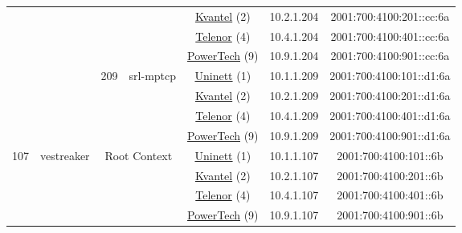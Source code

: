 \begin{small}
\begin{center}
\begin{longtable}{|c|c|c|c|c|c|c|c|}
  &  &  &  & \multicolumn{2}{|c|}{\tiny{\href{http://kvantel.no}{Kvantel} (2)}} & \tiny{10.2.1.204} & \tiny{2001:700:4100:201::cc:6a} \\* \cline{5-5}\cline{6-6}\cline{7-7}\cline{8-8}
  &  &  &  & \multicolumn{2}{|c|}{\tiny{\href{https://www.telenor.no}{Telenor} (4)}} & \tiny{10.4.1.204} & \tiny{2001:700:4100:401::cc:6a} \\* \cline{5-5}\cline{6-6}\cline{7-7}\cline{8-8}
  &  &  &  & \multicolumn{2}{|c|}{\tiny{\href{http://www.powertech.no}{PowerTech} (9)}} & \tiny{10.9.1.204} & \tiny{2001:700:4100:901::cc:6a} \\* \cline{3-3}\cline{4-4}\cline{5-5}\cline{6-6}\cline{7-7}\cline{8-8}
  &  & \multirow{4}{*}{\tiny{209}} & \multicolumn{1}{|l|}{\multirow{4}{*}{\tiny{srl-mptcp}}} & \multicolumn{2}{|c|}{\tiny{\href{https://www.uninett.no}{Uninett} (1)}} & \tiny{10.1.1.209} & \tiny{2001:700:4100:101::d1:6a} \\* \cline{5-5}\cline{6-6}\cline{7-7}\cline{8-8}
  &  &  &  & \multicolumn{2}{|c|}{\tiny{\href{http://kvantel.no}{Kvantel} (2)}} & \tiny{10.2.1.209} & \tiny{2001:700:4100:201::d1:6a} \\* \cline{5-5}\cline{6-6}\cline{7-7}\cline{8-8}
  &  &  &  & \multicolumn{2}{|c|}{\tiny{\href{https://www.telenor.no}{Telenor} (4)}} & \tiny{10.4.1.209} & \tiny{2001:700:4100:401::d1:6a} \\* \cline{5-5}\cline{6-6}\cline{7-7}\cline{8-8}
  &  &  &  & \multicolumn{2}{|c|}{\tiny{\href{http://www.powertech.no}{PowerTech} (9)}} & \tiny{10.9.1.209} & \tiny{2001:700:4100:901::d1:6a} \\ \hline
 \multirow{36}{*}{\tiny{107}} & \multicolumn{1}{|l|}{\multirow{36}{*}{\tiny{vestreaker}}} & \multicolumn{2}{|c|}{\multirow{4}{*}{\tiny{Root Context}}} & \multicolumn{2}{|c|}{\tiny{\href{https://www.uninett.no}{Uninett} (1)}} & \tiny{10.1.1.107} & \tiny{2001:700:4100:101::6b} \\* \cline{5-5}\cline{6-6}\cline{7-7}\cline{8-8}
  &  & \multicolumn{2}{|c|}{} & \multicolumn{2}{|c|}{\tiny{\href{http://kvantel.no}{Kvantel} (2)}} & \tiny{10.2.1.107} & \tiny{2001:700:4100:201::6b} \\* \cline{5-5}\cline{6-6}\cline{7-7}\cline{8-8}
  &  & \multicolumn{2}{|c|}{} & \multicolumn{2}{|c|}{\tiny{\href{https://www.telenor.no}{Telenor} (4)}} & \tiny{10.4.1.107} & \tiny{2001:700:4100:401::6b} \\* \cline{5-5}\cline{6-6}\cline{7-7}\cline{8-8}
  &  & \multicolumn{2}{|c|}{} & \multicolumn{2}{|c|}{\tiny{\href{http://www.powertech.no}{PowerTech} (9)}} & \tiny{10.9.1.107} & \tiny{2001:700:4100:901::6b} \\* \cline{3-3}\cline{4-4}\cline{5-5}\cline{6-6}\cline{7-7}\cline{8-8}

\end{longtable}
\end{center}
\end{small}
